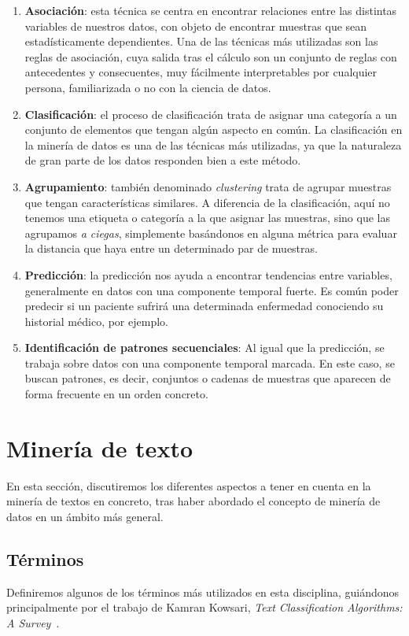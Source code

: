 \begin{enumerate}
    \item \textbf{Asociación}: esta técnica se centra en encontrar relaciones entre las distintas variables de nuestros datos, con objeto de encontrar muestras que sean estadísticamente dependientes. Una de las técnicas más utilizadas son las reglas de asociación, cuya salida tras el cálculo son un conjunto de reglas con antecedentes y consecuentes, muy fácilmente interpretables por cualquier persona, familiarizada o no con la ciencia de datos. \cite{associationrules1991}
    \item \textbf{Clasificación}: el proceso de clasificación trata de asignar una categoría a un conjunto de elementos que tengan algún aspecto en común. La clasificación en la minería de datos es una de las técnicas más utilizadas, ya que la naturaleza de gran parte de los datos responden bien a este método. \cite{Kumar2012ClassificationAF}
    \item \textbf{Agrupamiento}: también denominado \textit{clustering} trata de agrupar muestras que tengan características similares. A diferencia de la clasificación, aquí no tenemos una etiqueta o categoría a la que asignar las muestras, sino que las agrupamos \textit{a ciegas}, simplemente basándonos en alguna métrica para evaluar la distancia que haya entre un determinado par de muestras. \cite{Jain1999DataCA}
    \item \textbf{Predicción}: la predicción nos ayuda a encontrar tendencias entre variables, generalmente en datos con una componente temporal fuerte. \cite{han2012mining} Es común poder predecir si un paciente sufrirá una determinada enfermedad conociendo su historial médico, por ejemplo.
    \item \textbf{Identificación de patrones secuenciales}: Al igual que la predicción, se trabaja sobre datos con una componente temporal marcada. En este caso, se buscan patrones, es decir, conjuntos o cadenas de muestras que aparecen de forma frecuente en un orden concreto.
\end{enumerate}


\section{Minería de texto}
En esta sección, discutiremos los diferentes aspectos a tener en cuenta en la minería de textos en concreto, tras haber abordado el concepto de minería de datos en un ámbito más general.


\subsection{Términos}
Definiremos algunos de los términos más utilizados en esta disciplina, guiándonos principalmente por el trabajo de Kamran Kowsari, \textit{Text Classification Algorithms: A Survey}~\cite{Kowsari2019TextCA}.


